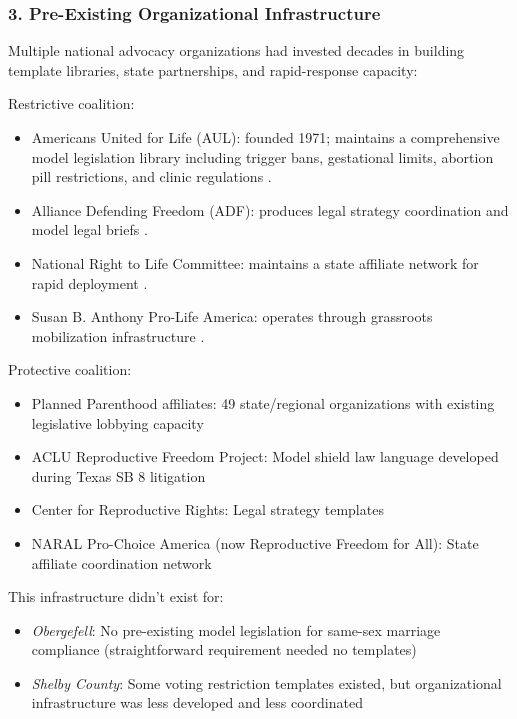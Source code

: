 \subsubsection{3. Pre-Existing Organizational Infrastructure}

Multiple national advocacy organizations had invested decades in building template libraries, state partnerships, and rapid-response capacity:

Restrictive coalition:
\begin{itemize}
\item Americans United for Life (AUL): founded 1971; maintains a comprehensive model legislation library including trigger bans, gestational limits, abortion pill restrictions, and clinic regulations \parencite{millerLandscapeTodaysAntiAbortion2024,dibrancoProfileRightAmericans2014}.
\item Alliance Defending Freedom (ADF): produces legal strategy coordination and model legal briefs \parencite{millerLandscapeTodaysAntiAbortion2024}.
\item National Right to Life Committee: maintains a state affiliate network for rapid deployment \parencite{millerLandscapeTodaysAntiAbortion2024}. 
\item Susan B. Anthony Pro-Life America: operates through grassroots mobilization infrastructure \parencite{millerLandscapeTodaysAntiAbortion2024}.
\end{itemize}

Protective coalition:
\begin{itemize}
\item Planned Parenthood affiliates: 49 state/regional organizations with existing legislative lobbying capacity
\item ACLU Reproductive Freedom Project: Model shield law language developed during Texas SB 8 litigation
\item Center for Reproductive Rights: Legal strategy templates
\item NARAL Pro-Choice America (now Reproductive Freedom for All): State affiliate coordination network
\end{itemize}

This infrastructure didn't exist for:
\begin{itemize}
\item \emph{Obergefell}: No pre-existing model legislation for same-sex marriage compliance (straightforward requirement needed no templates)
\item \emph{Shelby County}: Some voting restriction templates existed, but organizational infrastructure was less developed and less coordinated
\end{itemize}

